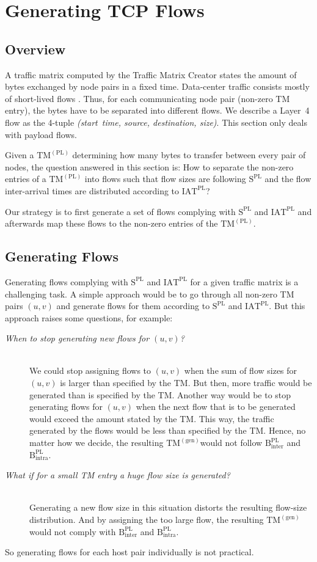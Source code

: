 \documentclass[journal,10pt]{IEEEtran}
\newcommand{\lf}{Layer~4}
\newcommand{\gentm}{\ensuremath{\mathrm{TM}^{(\mathrm{gen})}}}
\newcommand{\pltm}{\ensuremath{\mathrm{TM}^{(\mathrm{PL})}}}
\newcommand{\bytes}[2]{\ensuremath{\mathrm{B}^{\mathrm{#1}}_{\mathrm{#2}}}}
\newcommand{\iat}[1] {\ensuremath{\mathrm{IAT}^{\mathrm{#1}}}}
\newcommand{\size}[1]{\ensuremath{\mathrm{S}  ^{\mathrm{#1}}}}
\begin{document}
		
		

\section{Generating TCP Flows}
\label{sec:flows}
\subsection{Overview}
	A traffic matrix computed by the Traffic Matrix Creator states the amount of bytes exchanged by node pairs in a fixed time.
	Data-center traffic consists mostly of short-lived flows \cite{MSR-datacenters, datacentersInTheWild}.
	Thus, for each communicating node pair (non-zero TM entry), the bytes have to be separated into different flows.
We describe a \lf{} flow as the 4-tuple \emph{(start~time, source, destination, size)}.
	This section only deals with payload flows.
	
	Given a \pltm{} determining how many bytes to transfer between every pair of nodes,
	the question answered in this section is: 
	How to separate the non-zero entries of a \pltm{} into flows such that flow sizes are following \size{PL} and 
	the flow inter-arrival times are distributed according to \iat{PL}?
	
	Our strategy is to first generate a set of flows complying with \size{PL} and \iat{PL} and afterwards map these flows
	to the non-zero entries of the \pltm{}.

\subsection{Generating Flows}

Generating flows complying with \size{PL} and \iat{PL} for a given traffic matrix is a challenging task.
A simple approach would be to go through all non-zero TM pairs $(u,v)$ and generate flows for them according to \size{PL} and \iat{PL}.
But this approach raises some questions, for example:

\begin{description}
\item[\emph{When to stop generating new flows for $(u,v)$?}]~\\
We could stop assigning flows to $(u,v)$ when the sum of flow sizes for $(u,v)$ is larger than specified by the TM. But then,
more traffic would be generated than is specified by the TM.
Another way would be to stop generating flows for $(u,v)$ when the next flow that is to be generated would exceed the amount stated by the TM.
This way, the traffic generated by the flows would be less than specified by the TM.
Hence, no matter how we decide, the resulting \gentm would not follow \bytes{PL}{inter} and \bytes{PL}{intra}.
\item[\emph{What if for a small TM entry a huge flow size is generated?}] ~\\
Generating a new flow size in this situation distorts 
the resulting flow-size distribution.
And by assigning the too large flow, the resulting \gentm would not comply with \bytes{PL}{inter} and \bytes{PL}{intra}.
\end{description}
So generating flows for each host pair individually is not practical.
\end{document}
